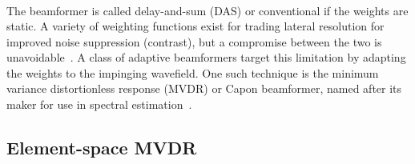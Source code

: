 {\begin{align}
\end{align}
%
%
%
%
%
The beamformer is called delay-and-sum (DAS) or conventional if the weights are static. A variety of weighting functions exist for trading lateral resolution for improved noise suppression (contrast), but a compromise between the two is unavoidable~\cite{Harris1978}. A class of adaptive beamformers target this limitation by adapting the weights to the impinging wavefield. One such technique is the minimum variance distortionless response (MVDR) or Capon beamformer, named after its maker for use in spectral estimation~\cite{Capon1969}.








\subsection{Element-space MVDR}

%

}
